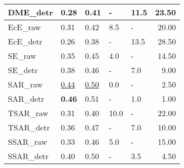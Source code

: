 \begin{tabular}{lllllr}
DME\_detr & 0.28 & 0.41 & - & 11.5 & 23.50 \\
\midrule
EcE\_raw & 0.31 & 0.42 & 8.5 & - & 20.00 \\
EcE\_detr & 0.26 & 0.38 & - & 13.5 & 28.50 \\
\midrule
SE\_raw & 0.35 & 0.45 & 4.0 & - & 14.50 \\
SE\_detr & 0.38 & 0.46 & - & 7.0 & 9.00 \\
\midrule
SAR\_raw & \underline{0.44} & \underline{0.50} & 0.0 & - & 2.50 \\
SAR\_detr & \textbf{0.46} & 0.51 & - & 1.0 & 1.00 \\
\midrule
TSAR\_raw & 0.31 & 0.40 & 10.0 & - & 22.00 \\
TSAR\_detr & 0.36 & 0.47 & - & 7.0 & 10.00 \\
\midrule
SSAR\_raw & 0.33 & 0.46 & 5.0 & - & 15.00 \\
SSAR\_detr & 0.40 & 0.50 & - & 3.5 & 4.50 \\
\midrule
\bottomrule
\end{tabular}
\midrule
